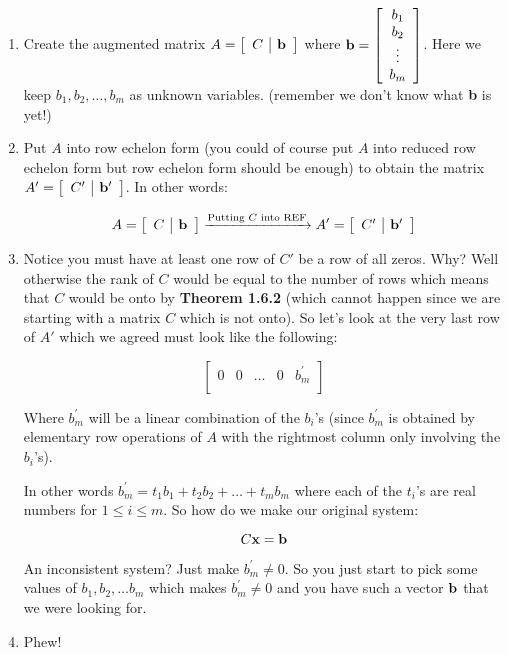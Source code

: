 \documentclass[12pt]{article}
\begin{document}
\begin{enumerate}
\item Create the augmented matrix $A = \left[ \begin {array}{c|c} C & {\bf b}\\\end {array} \right]$ where ${\bf b}=\left[ \begin{array}{c} b_1 \\ b_2 \\ \vdots \\ b_m  \end{array} \right]$.  Here we keep $b_1, b_2,\ldots , b_m$ as unknown variables.   (remember we don't know what {\bf b} is yet!)
\item Put $A$ into row echelon form (you could of course put $A$ into reduced row echelon form but row echelon form should be enough) to obtain the matrix $A' = \left[ \begin {array}{c|c} C' & {\bf b'}\\\end {array} \right]$.  In other words:

\[ A = \left[ \begin {array}{c|c} C & {\bf b}\\\end {array} \right] \xrightarrow[]{\text{Putting }C \text{ into REF}} A' = \left[ \begin {array}{c|c} C' & {\bf b}'\\\end {array} \right] \]

\item Notice you must have at least one row of $C'$ be a row of all zeros.  Why?  Well otherwise the rank of $C$ would be equal to the number of rows which means that $C$ would be onto by {\bf Theorem 1.6.2} (which cannot happen since we are starting with a matrix $C$ which is not onto).  So let's look at the very last row of $A'$ which we agreed must look like the following:

\[ \left[ \begin {array}{cccc|c} 0 & 0 & \ldots & 0 & b_m^{'}\\\end {array} \right] \]

Where $b_m^{'}$ will be a linear combination of the $b_i$'s (since $b_m^{'}$ is obtained by elementary row operations of $A$ with the rightmost column only involving the $b_i$'s).

In other words $b_{m}^{'}=t_1 b_1 + t_2 b_2 + \ldots + t_m b_m$ where each of the $t_i$'s are real numbers for $1\leq i \leq m$.  So how do we make our original system:

\[C{\bf x} = {\bf b}  \]

An inconsistent system?  Just make $b_m^{'} \neq 0$.  So you just start to pick some values of $b_1 , b_2 , \ldots b_m$ which makes $b_m^{'} \neq 0$ and you have such a vector ${\bf b}$ that we were looking for.

\item Phew!
\end{enumerate}
\end{document}
